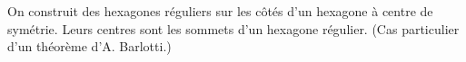 On construit des hexagones réguliers sur les côtés d'un hexagone à centre de symétrie. Leurs centres sont les sommets d'un hexagone régulier. (Cas particulier d'un théorème d'A. Barlotti.)
